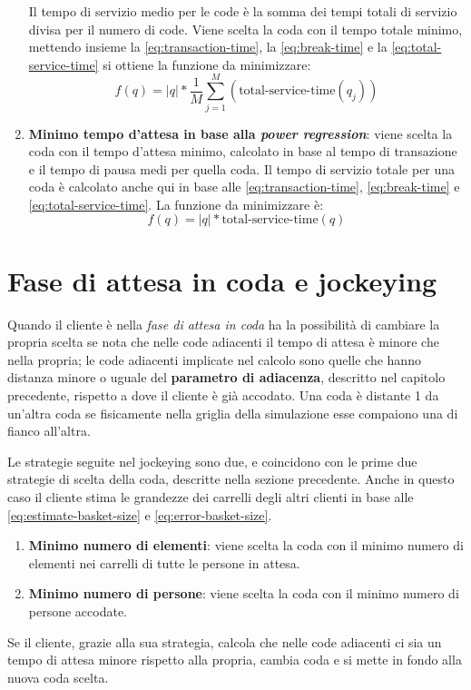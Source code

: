 \begin{enumerate}
Il tempo di servizio medio per le code è la somma dei tempi totali di servizio divisa per il numero di code. Viene scelta la coda con il tempo totale minimo, mettendo insieme la \ref{eq:transaction-time}, la \ref{eq:break-time} e la \ref{eq:total-service-time} si ottiene la funzione da minimizzare:
\begin{equation}
f(q) = |q| * \frac{1}{M}\sum\limits_{j=1}^M \left( \text{total-service-time}(q_j) \right)
\end{equation}
\item \textbf{Minimo tempo d'attesa in base alla \textit{power regression}}: viene scelta la coda con il tempo d'attesa minimo, calcolato in base al tempo di transazione e il tempo di pausa medi per quella coda. Il tempo di servizio totale per una coda è calcolato anche qui in base alle \ref{eq:transaction-time}, \ref{eq:break-time} e \ref{eq:total-service-time}. La funzione da minimizzare è:
\begin{equation}
f(q) = |q| * \text{total-service-time}(q)
\end{equation}
\end{enumerate}

\section{Fase di attesa in coda e jockeying}

Quando il cliente è nella \textit{fase di attesa in coda} ha la possibilità di cambiare la propria scelta se nota che nelle code adiacenti il tempo di attesa è minore che nella propria; le code adiacenti implicate nel calcolo sono quelle che hanno distanza minore o uguale del \textbf{parametro di adiacenza}, descritto nel capitolo precedente, rispetto a dove il cliente è già accodato. Una coda è distante 1 da un'altra coda se fisicamente nella griglia della simulazione esse compaiono una di fianco all'altra.

Le strategie seguite nel jockeying sono due, e coincidono con le prime due strategie di scelta della coda, descritte nella sezione precedente. Anche in questo caso il cliente stima le grandezze dei carrelli degli altri clienti in base alle \ref{eq:estimate-basket-size} e \ref{eq:error-basket-size}.

\begin{enumerate}
\item \textbf{Minimo numero di elementi}: viene scelta la coda con il minimo numero di elementi nei carrelli di tutte le persone in attesa.
\item \textbf{Minimo numero di persone}: viene scelta la coda con il minimo numero di persone accodate.
\end{enumerate}

Se il cliente, grazie alla sua strategia, calcola che nelle code adiacenti ci sia un tempo di attesa minore rispetto alla propria, cambia coda e si mette in fondo alla nuova coda scelta.